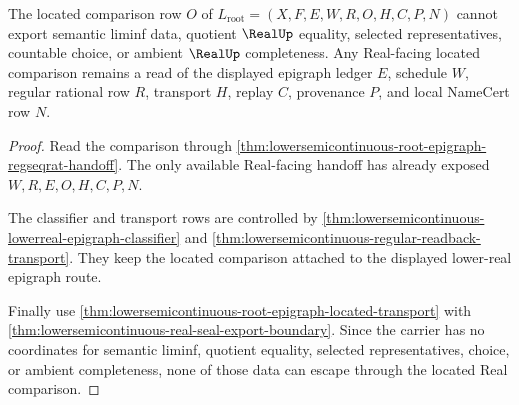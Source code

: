 \begin{theorem}
\label{thm:lowersemicontinuous-root-located-real-nonescape}
The located comparison row $O$ of
$L_{\mathrm{root}}=(X,F,E,W,R,O,H,C,P,N)$ cannot export semantic liminf data,
quotient $\RealUp$ equality, selected representatives, countable choice, or
ambient $\RealUp$ completeness. Any Real-facing located comparison remains a
read of the displayed epigraph ledger $E$, schedule $W$, regular rational row
$R$, transport $H$, replay $C$, provenance $P$, and local NameCert row $N$.
\end{theorem}
\begin{proof}
Read the comparison through
\autoref{thm:lowersemicontinuous-root-epigraph-regseqrat-handoff}. The only
available Real-facing handoff has already exposed $W,R,E,O,H,C,P,N$.

The classifier and transport rows are controlled by
\autoref{thm:lowersemicontinuous-lowerreal-epigraph-classifier} and
\autoref{thm:lowersemicontinuous-regular-readback-transport}. They keep the
located comparison attached to the displayed lower-real epigraph route.

Finally use \autoref{thm:lowersemicontinuous-root-epigraph-located-transport}
with \autoref{thm:lowersemicontinuous-real-seal-export-boundary}. Since the
carrier has no coordinates for semantic liminf, quotient equality, selected
representatives, choice, or ambient completeness, none of those data can escape
through the located Real comparison.
\end{proof}

